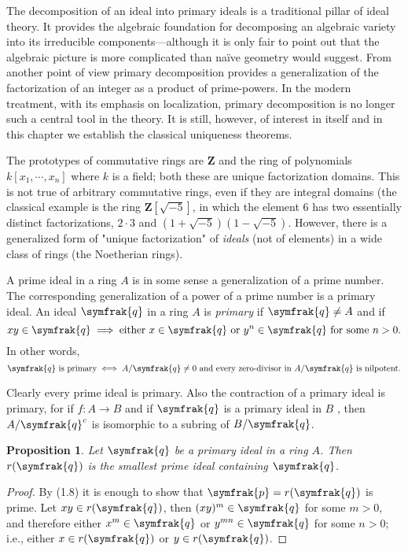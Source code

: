 \documentclass{standalone}
\newtheorem{proposition}{Proposition}
\theoremstyle{definition}
\theoremstyle{remark}
\begin{document}
The decomposition of an ideal into primary ideals is a traditional pillar of ideal
theory. It provides the algebraic foundation for decomposing an algebraic
variety into its irreducible components---although it is only fair to point out
that the algebraic picture is more complicated than na\"{i}ve geometry would
suggest. From another point of view primary decomposition provides a generalization
of the factorization of an integer as a product of prime-powers. In
the modern treatment, with its emphasis on localization, primary decomposition
is no longer such a central tool in the theory. It is still, however, of interest in
itself and in this chapter we establish the classical uniqueness theorems.

The prototypes of commutative rings are $\mathbf{Z}$ and the ring of polynomials
 $k[x_1,\cdots,x_n]$ where $k$ is a field; both these are unique factorization domains.
This is not true of arbitrary commutative rings, even if they are integral domains
(the classical example is the ring $\mathbf{Z}[\sqrt{-5}]$, in which the element 6 has two
essentially distinct factorizations, $2\cdot 3$ and $(1+\sqrt{-5})(1-\sqrt{-5})$. However,
there is a generalized form of "unique factorization" of \textit{ideals} (not of elements)
in a wide class of rings (the Noetherian rings).

A prime ideal in a ring $A$ is in some sense a generalization of a prime number.
The corresponding generalization of a power of a prime number is a
primary ideal. An ideal $\symfrak{q}$ in a ring $A$ is \textit{primary}
if $\symfrak{q}\neq A$ and if
\[
  xy\in\symfrak{q}\implies\text{either }x\in\symfrak{q}\text{ or
  }y^n\in\symfrak{q}\text{ for some }n>0.
\]
In other words,
\[
\symfrak{q}\text{ is primary}\iff A/\symfrak{q}\ne 0 \text{ and every
  zero-divisor in }A/\symfrak{q}\text{ is nilpotent}.
\]

Clearly every prime ideal is primary. Also the contraction of a primary
ideal is primary, for if $f:A\to B$ and if $\symfrak{q}$ is a primary ideal in
$B$
, then $A/\symfrak{q}^c$ is isomorphic to a subring of $B/\symfrak{q}$.
\begin{proposition}
  Let $\symfrak{q}$ be a primary ideal in a ring $A$. Then $r(\symfrak{q})$ is the smallest
  prime ideal containing $\symfrak{q}$.
\end{proposition}
\begin{proof}
  By (1.8) it is enough to show that $\symfrak{p}=r(\symfrak{q})$ is prime.
  Let $xy\in r(\symfrak{q})$, then $(xy)^m\in \symfrak{q}$ for some $m>0$, and
  therefore either $x^m\in \symfrak{q}$ or $y^{mn}\in \symfrak{q}$ for some
  $n>0$; i.e., either $x\in r(\symfrak{q})$ or $y \in r(\symfrak{q})$.
\end{proof}
\end{document}
